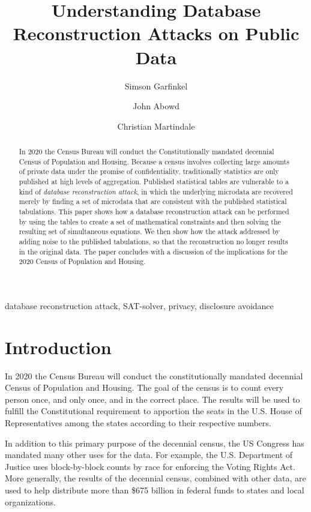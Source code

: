 \documentclass[runningheads]{llncs}
\begin{document}
\title{Understanding Database Reconstruction Attacks on Public Data}
\author{Simson Garfinkel \and John Abowd \and Christian Martindale }

\maketitle
\begin{abstract}
In 2020 the Census Bureau will conduct the Constitutionally mandated
decennial Census of Population and Housing. Because a census involves
collecting large amounts of private data under the promise of
confidentiality, traditionally statistics are only published at high
levels of aggregation.  Published statistical tables are vulnerable
to a kind of \emph{database reconstruction attack}, in which the
underlying microdata are recovered merely by finding a set of
microdata that are consistent with the published statistical
tabulations. This paper shows how a database reconstruction attack can
be performed by using the tables to create a set of mathematical
constraints and then solving the resulting set of simultaneous
equations.  We then show how the attack addressed by adding noise to
the published tabulations, so that the reconstruction no longer results
in the original data. The paper concludes with a discussion of the
implications for the 2020 Census of Population and Housing.
\end{abstract}

\begin{keywords}
database reconstruction attack, SAT-solver, privacy, disclosure avoidance
\end{keywords}

\section{Introduction}
In 2020 the Census Bureau will conduct the constitutionally mandated
decennial Census of Population and Housing. The goal of the census is
to count every person once, and only once, and in the correct
place. The results will be used to fulfill the Constitutional
requirement to apportion the seats in the U.S. House of
Representatives among the states according to their respective
numbers.

In addition to this primary purpose of the decennial census, the
US Congress has mandated many other uses for the data. For
example, the U.S. Department of Justice uses block-by-block counts by
race for enforcing the Voting Rights Act. More generally, the results
of the decennial census, combined with other data, are used to help
distribute more than \$675 billion in federal funds to states and
local organizations.
\end{document}
